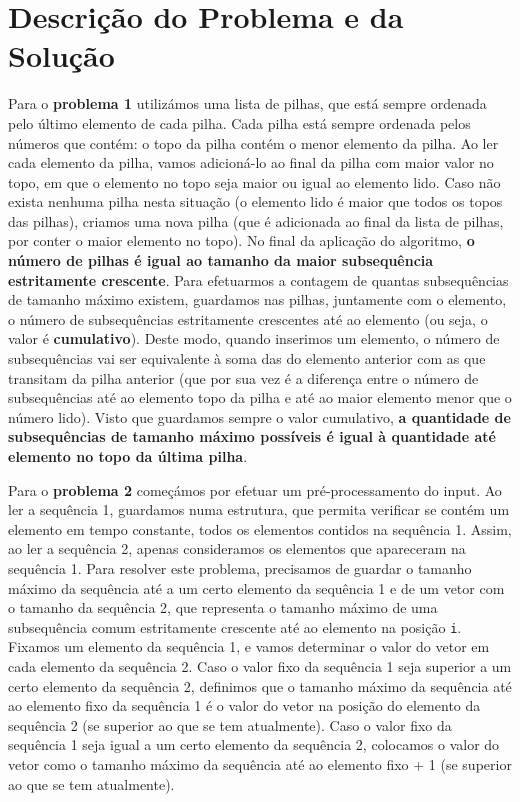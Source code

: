 \documentclass[12pt,a4paper]{article}
\begin{document}
  \section{Descrição do Problema e da Solução}

  Para o \textbf{problema 1} utilizámos uma lista de pilhas, que está sempre ordenada pelo último elemento de cada pilha.
  Cada pilha está sempre ordenada pelos números que contém: o topo da pilha contém o menor elemento da pilha.
  Ao ler cada elemento da pilha, vamos adicioná-lo ao final da pilha com maior valor no topo, em que o elemento no topo seja maior ou igual ao elemento lido.
  Caso não exista nenhuma pilha nesta situação (o elemento lido é maior que todos os topos das pilhas), criamos uma nova pilha (que é adicionada ao final da lista de pilhas, por conter o maior elemento no topo).
  No final da aplicação do algoritmo, \textbf{o número de pilhas é igual ao tamanho da maior subsequência estritamente crescente}.
  Para efetuarmos a contagem de quantas subsequências de tamanho máximo existem, guardamos nas pilhas, juntamente com o elemento, o número de subsequências estritamente crescentes até ao elemento (ou seja, o valor é \textbf{cumulativo}).
  Deste modo, quando inserimos um elemento, o número de subsequências vai ser equivalente à soma das do elemento anterior com as que transitam da pilha anterior (que por sua vez é a diferença entre o número de subsequências até ao elemento topo da pilha e até ao maior elemento menor que o número lido).
  Visto que guardamos sempre o valor cumulativo, \textbf{a quantidade de subsequências de tamanho máximo possíveis é igual à quantidade até elemento no topo da última pilha}.

  Para o \textbf{problema 2} começámos por efetuar um pré-processamento do input.
  Ao ler a sequência 1, guardamos numa estrutura, que permita verificar se contém um elemento em tempo constante, todos os elementos contidos na sequência 1.
  Assim, ao ler a sequência 2, apenas consideramos os elementos que apareceram na sequência 1.
  Para resolver este problema, precisamos de guardar o tamanho máximo da sequência até a um certo elemento da sequência 1 e de um vetor com o tamanho da sequência 2, que representa o tamanho máximo de uma subsequência comum estritamente crescente até ao elemento na posição \texttt{i}.
  Fixamos um elemento da sequência 1, e vamos determinar o valor do vetor em cada elemento da sequência 2.
  Caso o valor fixo da sequência 1 seja superior a um certo elemento da sequência 2, definimos que o tamanho máximo da sequência até ao elemento fixo da sequência 1 é o valor do vetor na posição do elemento da sequência 2 (se superior ao que se tem atualmente).
  Caso o valor fixo da sequência 1 seja igual a um certo elemento da sequência 2, colocamos o valor do vetor como o tamanho máximo da sequência até ao elemento fixo + 1 (se superior ao que se tem atualmente).
\end{document}
